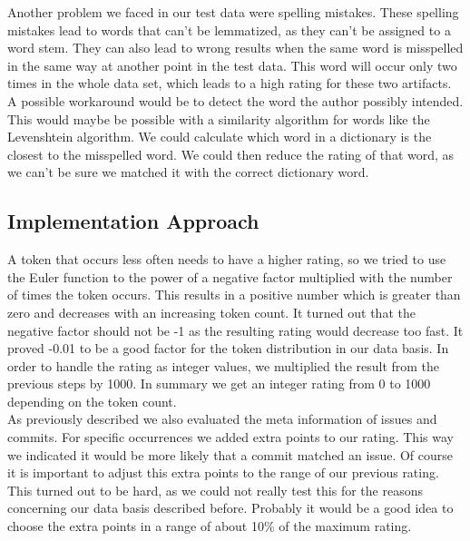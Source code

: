 Another problem we faced in our test data were spelling mistakes.
These spelling mistakes lead to words that can't be lemmatized, as they can't be assigned to a word stem.
They can also lead to wrong results when the same word is misspelled in the same way at another point in the test data.
This word will occur only two times in the whole data set, which leads to a high rating for these two artifacts.
A possible workaround would be to detect the word the author possibly intended.
This would maybe be possible with a similarity algorithm for words like the Levenshtein algorithm.
We could calculate which word in a dictionary is the closest to the misspelled word.
We could then reduce the rating of that word, as we can't be sure we matched it with the correct dictionary word.

\subsection{Implementation Approach}
A token that occurs less often needs to have a higher rating, so we tried to use the Euler function to the power of a negative factor multiplied with the number of times the token occurs.
This results in a positive number which is greater than zero and decreases with an increasing token count.
It turned out that the negative factor should not be -1 as the resulting rating would decrease too fast.
It proved -0.01 to be a good factor for the token distribution in our data basis.
In order to handle the rating as integer values, we multiplied the result from the previous steps by 1000.
In summary we get an integer rating from 0 to 1000 depending on the token count.\\

As previously described we also evaluated the meta information of issues and commits.
For specific occurrences we added extra points to our rating.
This way we indicated it would be more likely that a commit matched an issue.
Of course it is important to adjust this extra points to the range of our previous rating.
This turned out to be hard, as we could not really test this for the reasons concerning our data basis described before.
Probably it would be a good idea to choose the extra points in a range of about 10\% of the maximum rating.
